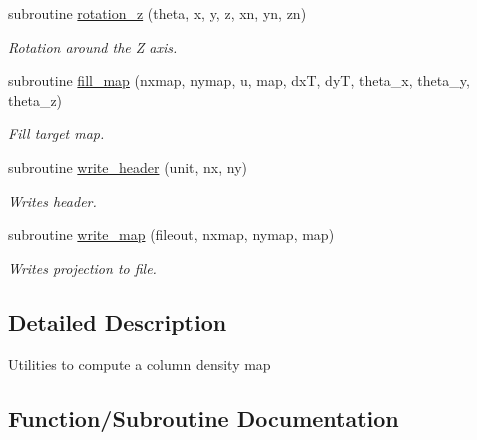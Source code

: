 \begin{DoxyCompactItemize}
subroutine \hyperlink{namespacecoldens__utilities_a062761acebb4d5a76b3706256a491687}{rotation\+\_\+z} (theta, x, y, z, xn, yn, zn)
\begin{DoxyCompactList}\small\item\em Rotation around the Z axis. \end{DoxyCompactList}\item 
subroutine \hyperlink{namespacecoldens__utilities_af035b829538114f8b62f54365269bdab}{fill\+\_\+map} (nxmap, nymap, u, map, dx\+T, dy\+T, theta\+\_\+x, theta\+\_\+y, theta\+\_\+z)
\begin{DoxyCompactList}\small\item\em Fill target map. \end{DoxyCompactList}\item 
subroutine \hyperlink{namespacecoldens__utilities_ab85f0688ddbdcef34c8ed7f53c3071c5}{write\+\_\+header} (unit, nx, ny)
\begin{DoxyCompactList}\small\item\em Writes header. \end{DoxyCompactList}\item 
subroutine \hyperlink{namespacecoldens__utilities_a78891c0c5736f8d50bf07d19757e7237}{write\+\_\+map} (fileout, nxmap, nymap, map)
\begin{DoxyCompactList}\small\item\em Writes projection to file. \end{DoxyCompactList}\end{DoxyCompactItemize}


\subsection{Detailed Description}
Utilities to compute a column density map 

\subsection{Function/\+Subroutine Documentation}
\hypertarget{namespacecoldens__utilities_af035b829538114f8b62f54365269bdab}{}

